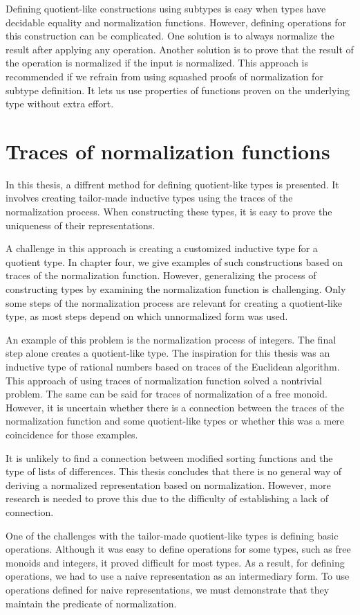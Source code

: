 Defining quotient-like constructions using subtypes is easy when types have decidable equality and normalization functions. However, defining operations for this construction can be complicated. One solution is to always normalize the result after applying any operation. Another solution is to prove that the result of the operation is normalized if the input is normalized. This approach is recommended if we refrain from using squashed proofs of normalization for subtype definition. It lets us use properties of functions proven on the underlying type without extra effort.
\section{Traces of normalization functions}
In this thesis, a diffrent method for defining quotient-like types is presented. It involves creating tailor-made inductive types using the traces of the normalization process. When constructing these types, it is easy to prove the uniqueness of their representations.

A challenge in this approach is creating a customized inductive type for a quotient type. In chapter four, we give examples of such constructions based on traces of the normalization function. However, generalizing the process of constructing types by examining the normalization function is challenging. Only some steps of the normalization process are relevant for creating a quotient-like type, as most steps depend on which unnormalized form was used.

An example of this problem is the normalization process of integers. The final step alone creates a quotient-like type. The inspiration for this thesis was an inductive type of rational numbers based on traces of the Euclidean algorithm. This approach of using traces of normalization function solved a nontrivial problem. The same can be said for traces of normalization of a free monoid. However, it is uncertain whether there is a connection between the traces of the normalization function and some quotient-like types or whether this was a mere coincidence for those examples.

It is unlikely to find a connection between modified sorting functions and the type of lists of differences. This thesis concludes that there is no general way of deriving a normalized representation based on normalization. However, more research is needed to prove this due to the difficulty of establishing a lack of connection.

One of the challenges with the tailor-made quotient-like types is defining basic operations. Although it was easy to define operations for some types, such as free monoids and integers, it proved difficult for most types. As a result, for defining operations, we had to use a naive representation as an intermediary form. To use operations defined for naive representations, we must demonstrate that they maintain the predicate of normalization.

